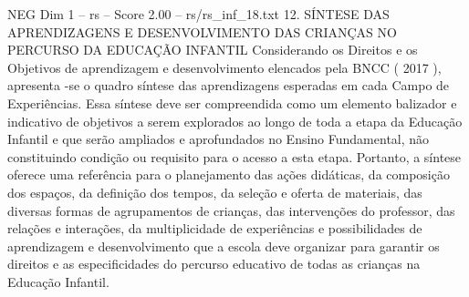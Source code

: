 \begin{textsample}{NEG Dim 1 – rs – Score 2.00 – rs/rs\_inf\_18.txt}  \label{ex:f1_neg_086}
12.
SÍNTESE DAS APRENDIZAGENS E DESENVOLVIMENTO DAS CRIANÇAS NO PERCURSO DA EDUCAÇÃO INFANTIL Considerando os Direitos e os Objetivos de aprendizagem e desenvolvimento elencados pela BNCC ( 2017 ), apresenta -se o quadro síntese das aprendizagens esperadas em cada Campo de Experiências.
Essa síntese deve ser compreendida como um elemento balizador e indicativo de objetivos a serem explorados ao longo de toda a etapa da Educação Infantil e que serão ampliados e aprofundados no Ensino Fundamental, não constituindo condição ou requisito para o acesso a esta etapa.
Portanto, a síntese oferece uma referência para o planejamento das ações didáticas, da composição dos espaços, da definição dos tempos, da seleção e oferta de materiais, das diversas formas de agrupamentos de crianças, das intervenções do professor, das relações e interações, da multiplicidade de experiências e possibilidades de aprendizagem e desenvolvimento que a escola deve organizar para garantir os direitos e as especificidades do percurso educativo de todas as crianças na Educação Infantil.

\end{textsample}
